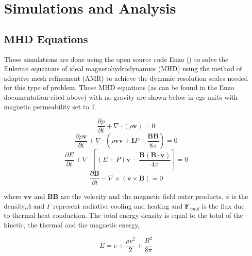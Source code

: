 \section{Simulations and Analysis}

\subsection{MHD Equations}
These simulations are done using the open source code Enzo (\citet{Bryan14}) to
solve the Eulerian equations of ideal magnetohydrodynamics (MHD) using the
method of adaptive mesh refinement (AMR) to achieve the dynamic resolution scales
needed for this type of problem. These MHD equations (as can be found in the
Enzo documentation cited above) with no gravity are shown below in cgs
units with magnetic permeability set to 1.   

\begin{equation} \label{eq:MHD1}
    \frac{\partial \rho}{\partial t}
+ \nabla \cdot
(\rho \mathbf{v})
= 0
\end{equation}
\begin{equation} \label{eq:MHD2}
    \frac{\partial \rho \mathbf{v} }{\partial t}
+ \nabla \cdot
\left(
        \rho \mathbf{v} \mathbf{v}
        + \mathbf{I} P
        - \frac { \mathbf{B} \mathbf{B} }{ 8 \pi }
\right)
=
0
\end{equation}
\begin{equation} \label{eq:MHD3}
\frac{\partial E}{\partial t}
+ \nabla \cdot
\left[
        (E + P) \mathbf{v}
        -
        \frac
        { \mathbf{B} ( \mathbf{B} \cdot \mathbf{v} ) }
        { 4 \pi }
\right]
= 0
\end{equation}
\begin{equation} \label{eq:MHD4}
\frac {\partial \mathbf{B} }{\partial t}
- \nabla \times ( \mathbf{v} \times \mathbf{B})
=0
\end{equation}


where $\mathbf{v}\mathbf{v}$ and $\mathbf{B}\mathbf{B}$ are
the velocity and the magnetic field outer products, $\phi$ is
the density,$\Lambda$ and $\Gamma$ represent
radiative cooling and heating and $\mathbf{F}_{cond}$ is the flux due to thermal
heat conduction.
The total energy density  is
equal to the total of the kinetic,
the thermal and the magnetic energy,

\begin{equation} \label{eq:E-total}
E = e + \frac{ \rho v^2 }{ 2 } + \frac{B^2}{8\pi}
\end{equation}


